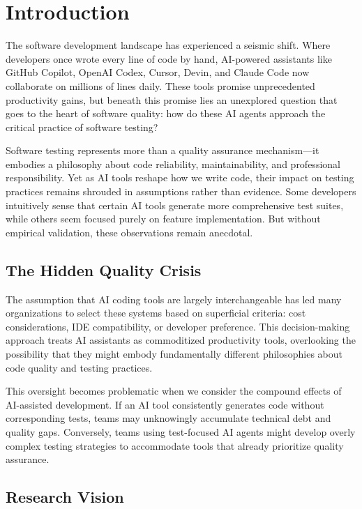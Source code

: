 \documentclass[conference]{IEEEtran}
\begin{document}
\section{Introduction}

The software development landscape has experienced a seismic shift. Where developers once wrote every line of code by hand, AI-powered assistants like GitHub Copilot, OpenAI Codex, Cursor, Devin, and Claude Code now collaborate on millions of lines daily. These tools promise unprecedented productivity gains, but beneath this promise lies an unexplored question that goes to the heart of software quality: how do these AI agents approach the critical practice of software testing?

Software testing represents more than a quality assurance mechanism—it embodies a philosophy about code reliability, maintainability, and professional responsibility. Yet as AI tools reshape how we write code, their impact on testing practices remains shrouded in assumptions rather than evidence. Some developers intuitively sense that certain AI tools generate more comprehensive test suites, while others seem focused purely on feature implementation. But without empirical validation, these observations remain anecdotal.

\subsection{The Hidden Quality Crisis}

The assumption that AI coding tools are largely interchangeable has led many organizations to select these systems based on superficial criteria: cost considerations, IDE compatibility, or developer preference. This decision-making approach treats AI assistants as commoditized productivity tools, overlooking the possibility that they might embody fundamentally different philosophies about code quality and testing practices.

This oversight becomes problematic when we consider the compound effects of AI-assisted development. If an AI tool consistently generates code without corresponding tests, teams may unknowingly accumulate technical debt and quality gaps. Conversely, teams using test-focused AI agents might develop overly complex testing strategies to accommodate tools that already prioritize quality assurance.

\subsection{Research Vision}
\end{document}
